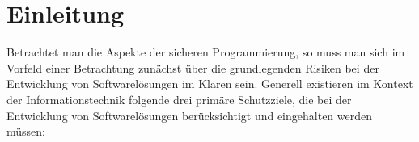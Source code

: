 \section{Einleitung}\label{einleitung}




%
%

Betrachtet man die Aspekte der sicheren Programmierung, so muss man sich im Vorfeld einer Betrachtung zunächst über die grundlegenden  Risiken bei der Entwicklung von Softwarelösungen im Klaren sein. Generell existieren im Kontext der Informationstechnik folgende drei primäre Schutzziele, die bei der Entwicklung von Softwarelösungen berücksichtigt und eingehalten werden müssen:

